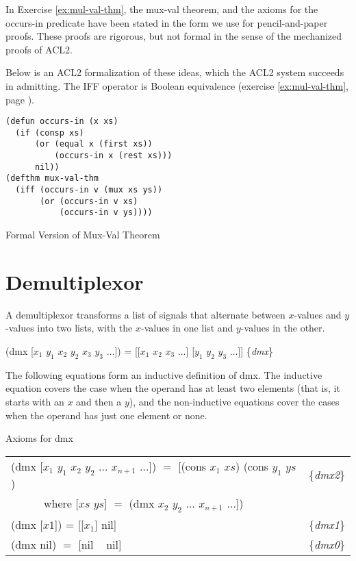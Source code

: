 \begin{aside}
In Exercise \ref{ex:mul-val-thm}, the mux-val theorem,
and the axioms for the occurs-in predicate
have been stated in the form we use for pencil-and-paper proofs.
These proofs are rigorous, but not formal
in the sense of the mechanized proofs of ACL2.

Below is an ACL2 formalization of these ideas,
which the ACL2 system succeeds in admitting.
\label{acl2:iff}
The IFF operator is Boolean equivalence
(exercise \ref{ex:mul-val-thm}, page \pageref{def:equivalence-op}).
\\

\label{defun:occurs-in}
\begin{Verbatim}
(defun occurs-in (x xs)
  (if (consp xs)
      (or (equal x (first xs))
          (occurs-in x (rest xs)))
      nil))
(defthm mux-val-thm
  (iff (occurs-in v (mux xs ys))
       (or (occurs-in v xs)
           (occurs-in v ys))))
\end{Verbatim}
\label{defthm:mux-val}

\caption{Formal Version of Mux-Val Theorem}
\label{aside:mux-val-thm}
\end{aside}


\section{Demultiplexor}
\label{sec:dmx}

A demultiplexor transforms a list of signals that alternate between
$x$-values and $y$-values into two lists,
with the $x$-values in one list and $y$-values in the other.

\hspace{1cm} (dmx [$x_1$ $y_1$ $x_2$ $y_2$ $x_3$ $y_3$ $\dots$]) =
[[$x_1$ $x_2$ $x_3$ $\dots$] [$y_1$ $y_2$ $y_3$ $\dots$]]
\hfill \{\emph{dmx}\}

The following equations form an inductive definition of dmx.
The inductive equation covers the case when
the operand has at least two elements
(that is, it starts with an $x$ and then a $y$),
and the non-inductive equations cover the cases
when the operand has just one element or none.
\begin{center}
Axioms for dmx
\begin{tabular}{ll}
(dmx [$x_1$ $y_1$ $x_2$ $y_2$ $\dots$ $x_{n+1}$ $\dots$]) $=$ [(cons $x_1$ $xs$) (cons $y_1$ $ys$) &\{\emph{dmx2}\} \\
~~~~~~where [$xs$ $ys$] $=$ (dmx $x_2$ $y_2$ $\dots$ $x_{n+1}$ $\dots$])                           &\\
(dmx [$x1$]) =  [[$x_1$] nil]                                                                      &\{\emph{dmx1}\} \\
(dmx nil) $=$ [nil ~ nil]                                                                          &\{\emph{dmx0}\} \\
\end{tabular}
\end{center}

